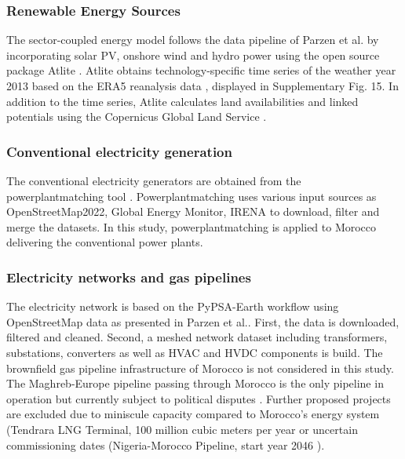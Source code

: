 \documentclass[5p,numafflabel]{elsarticle}
\begin{document}
\subsubsection*{Renewable Energy Sources}
The sector-coupled energy model follows the data pipeline of Parzen et al.\cite{Parzen2023} by incorporating solar PV, onshore wind and hydro power using the open source package Atlite \cite{Hofmann2021}.
Atlite obtains technology-specific time series of the weather year 2013 based on the ERA5 reanalysis data \cite{Hersbach2020}, displayed in Supplementary Fig. 15. %
In addition to the time series, Atlite calculates land availabilities and linked potentials using the Copernicus Global Land Service \cite{Buchhorn2020}.






\subsubsection*{Conventional electricity generation}
The conventional electricity generators are obtained from the powerplantmatching tool \cite{Powerplantmatching2019}. Powerplantmatching uses various input sources as OpenStreetMap2022, Global Energy Monitor, IRENA \cite{IRENA2022, OpenStreetMap2022, GlobalEnergyMonitor} to download, filter and merge the datasets. 
In this study, powerplantmatching is applied to Morocco delivering the conventional power plants.

\subsubsection*{Electricity networks and gas pipelines}
The electricity network is based on the PyPSA-Earth workflow using OpenStreetMap data \cite{OpenStreetMap2022} as presented in Parzen et al.\cite{Parzen2023}. First, the data is downloaded, filtered and cleaned. Second, a meshed network dataset including transformers, substations, converters as well as HVAC and HVDC components is build\cite{Parzen2023}. 
The brownfield gas pipeline infrastructure of Morocco is not considered in this study. The Maghreb-Europe pipeline passing through Morocco is the only pipeline in operation but currently subject to political disputes \cite{Rachidi2022}. Further proposed projects are excluded due to  miniscule capacity compared to Morocco's energy system (Tendrara LNG Terminal, 100 million cubic meters per year or uncertain commissioning dates (Nigeria-Morocco Pipeline, start year 2046 \cite{GEM2023b}).
\end{document}
